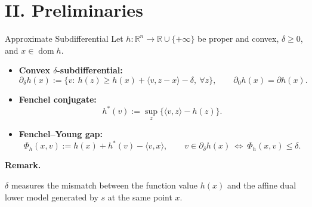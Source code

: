 \documentclass[10pt]{beamer}
\begin{document}
\section{II. Preliminaries}
\begin{frame}{Approximate Subdifferential}
\small
Let $h:\mathbb R^n\to\mathbb R\cup\{+\infty\}$ be proper and convex,
$\delta\ge0$, and $x\in\operatorname{dom}h$.
\begin{itemize}\setlength{\itemsep}{4pt}
    \item \textbf{Convex $\delta$-subdifferential:}
    \[
        \partial_\delta h(x):=
        \bigl\{v:\ h(z)\ge h(x)+\langle v,z-x\rangle-\delta,\ \forall z\bigr\},
        \qquad \partial_0 h(x)=\partial h(x).
    \]
    \item \textbf{Fenchel conjugate:}
    \[
        h^*(v):=\sup_z\{\langle v,z\rangle-h(z)\}.
    \]
    \item \textbf{Fenchel--Young gap:}
    \[
        \Phi_h(x,v):=h(x)+h^*(v)-\langle v,x\rangle,
        \qquad
        v\in\partial_\delta h(x)\ \Longleftrightarrow\ \Phi_h(x,v)\le\delta.
    \]
\end{itemize}

\medskip
\textbf{Remark.}

$\delta$ measures the mismatch between the function value
$h(x)$ and the affine dual lower model generated by $s$ at the
same point $x$.
\end{frame}
\end{document}
